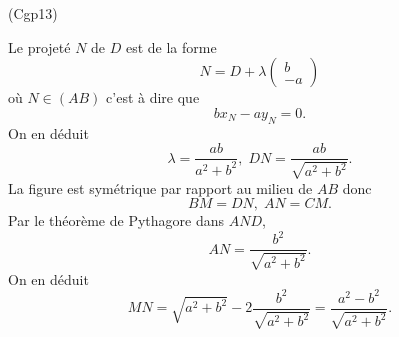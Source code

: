 \begin{tiny}(Cgp13)\end{tiny} Le projeté $N$ de $D$ est de la forme
\begin{displaymath}
  N = D +\lambda 
  \begin{pmatrix}
    b\\ -a
  \end{pmatrix}
\end{displaymath}
où $N \in (AB)$ c'est à dire que 
\begin{displaymath}
  bx_N - ay_N = 0.
\end{displaymath}
On en déduit
\begin{displaymath}
  \lambda = \frac{ab}{a^2 + b^2}, \;DN = \frac{ab}{\sqrt{a^2+b^2}}.
\end{displaymath}
La figure est symétrique par  rapport au milieu de $AB$ donc
\begin{displaymath}
  BM = DN, \; AN = CM.
\end{displaymath}
Par le théorème de Pythagore dans $AND$,
\begin{displaymath}
  AN = \frac{b^2}{\sqrt{a^2 + b^2}}.
\end{displaymath}
On en déduit
\begin{displaymath}
  MN = \sqrt{a^2 + b^2} -2 \frac{b^2}{\sqrt{a^2+b^2}}
  = \frac{a^2 - b^2}{\sqrt{a^2 + b^2}}.
\end{displaymath}



